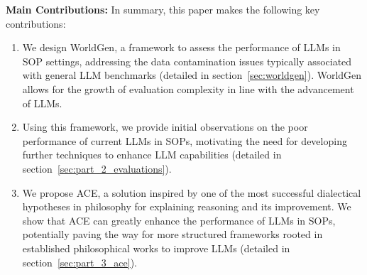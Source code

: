 \textbf{Main Contributions:}
In summary, this paper makes the following key contributions:
\begin{enumerate}
    \item We design WorldGen, a framework to assess the performance of LLMs in SOP settings, addressing the data contamination issues typically associated with general LLM benchmarks (detailed in section~\ref{sec:worldgen}). WorldGen allows for the growth of evaluation complexity in line with the advancement of LLMs.
    \item Using this framework, we provide initial observations on the poor performance of current LLMs in SOPs, motivating the need for developing further techniques to enhance LLM capabilities (detailed in section~\ref{sec:part_2_evaluations}).
    \item We propose ACE, a solution inspired by one of the most successful dialectical hypotheses in philosophy for explaining reasoning and its improvement. We show that ACE can greatly enhance the performance of LLMs in SOPs, potentially paving the way for more structured frameworks rooted in established philosophical works to improve LLMs (detailed in section~\ref{sec:part_3_ace}).
\end{enumerate}

